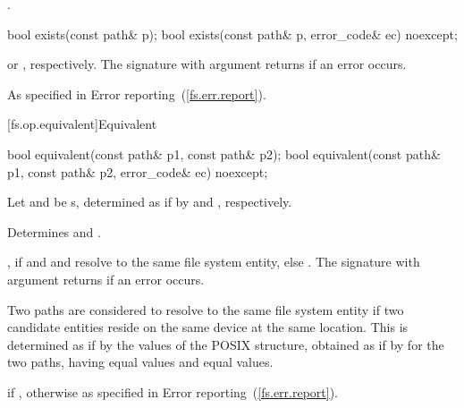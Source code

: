 \begin{itemdescr}
\pnum
\returns {}.
\end{itemdescr}

\begin{itemdecl}
bool exists(const path& p);
bool exists(const path& p, error_code& ec) noexcept;
\end{itemdecl}

\begin{itemdescr}
\pnum
\returns {} or ,
  respectively. The signature with argument  returns 
  if an error occurs.

\pnum
\throws As specified in Error reporting~(\ref{fs.err.report}).
\end{itemdescr}


[fs.op.equivalent]{Equivalent}

\begin{itemdecl}
bool equivalent(const path& p1, const path& p2);
bool equivalent(const path& p1, const path& p2, error_code& ec) noexcept;
\end{itemdecl}

\begin{itemdescr}
\pnum
Let  and  be s, determined
as if by  and , respectively.

\pnum
\effects Determines  and .

\pnum
\returns {}, if  and  and  resolve to the same file
  system entity, else . The signature with argument 
  returns  if an error occurs.

\pnum
Two paths are considered to resolve to the same file system entity if two
  candidate entities reside on the same device at the same location. This is
  determined as if by the values of the POSIX  structure,
  obtained as if by  for the two paths, having equal  values
  and equal  values.

\pnum
\throws {} if ,
  otherwise as specified in Error reporting~(\ref{fs.err.report}).
\end{itemdescr}


